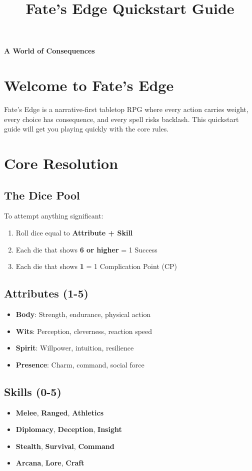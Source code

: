 \documentclass[11pt]{article}
\title{Fate's Edge Quickstart Guide}
\author{}
\date{}
\begin{document}
\maketitle

\begin{center}
\textbf{A World of Consequences}
\end{center}

\section{Welcome to Fate's Edge}

Fate's Edge is a narrative-first tabletop RPG where every action carries weight, every choice has consequence, and every spell risks backlash. This quickstart guide will get you playing quickly with the core rules.

\section{Core Resolution}

\subsection{The Dice Pool}
To attempt anything significant:
\begin{enumerate}
    \item Roll dice equal to \textbf{Attribute + Skill}
    \item Each die that shows \textbf{6 or higher} = 1 Success
    \item Each die that shows \textbf{1} = 1 Complication Point (CP)
\end{enumerate}

\subsection{Attributes (1-5)}
\begin{itemize}
    \item \textbf{Body}: Strength, endurance, physical action
    \item \textbf{Wits}: Perception, cleverness, reaction speed  
    \item \textbf{Spirit}: Willpower, intuition, resilience
    \item \textbf{Presence}: Charm, command, social force
\end{itemize}

\subsection{Skills (0-5)}
\begin{itemize}
    \item \textbf{Melee}, \textbf{Ranged}, \textbf{Athletics}
    \item \textbf{Diplomacy}, \textbf{Deception}, \textbf{Insight}
    \item \textbf{Stealth}, \textbf{Survival}, \textbf{Command}
    \item \textbf{Arcana}, \textbf{Lore}, \textbf{Craft}
\end{itemize}
\end{document}
